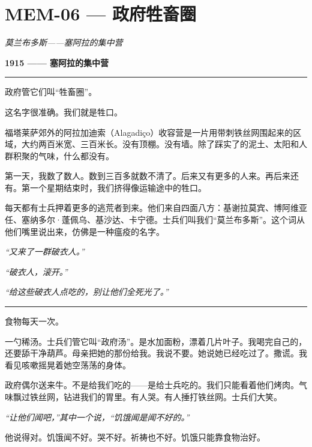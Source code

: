 \section*{\textbf{MEM-06} --- 政府牲畜圈}

\noindent \textit{莫兰布多斯——塞阿拉的集中营}

\noindent \textbf{1915 —— 塞阿拉的集中营}

\vspace{0.5em}\noindent\rule{\textwidth}{0.5pt}\vspace{0.5em}

\noindent 政府管它们叫“牲畜圈”。

\noindent 这名字很准确。我们就是牲口。

\noindent 福塔莱萨郊外的阿拉加迪索（Alagadiço）收容营是一片用带刺铁丝网围起来的区域，大约两百米宽、三百米长。没有顶棚。没有墙。除了踩实了的泥土、太阳和人群积聚的气味，什么都没有。

\noindent 第一天，我数了数人。数到三百多就数不清了。后来又有更多的人来。再后来还有。第一个星期结束时，我们挤得像运输途中的牲口。

\noindent 每天都有士兵押着更多的逃荒者到来。他们来自四面八方：基谢拉莫宾、博阿维亚任、塞纳多尔·蓬佩乌、基沙达、卡宁德。士兵们叫我们“莫兰布多斯”。这个词从他们嘴里说出来，仿佛是一种瘟疫的名字。

\noindent \textit{“又来了一群破衣人。”}

\noindent \textit{“破衣人，滚开。”}

\noindent \textit{“给这些破衣人点吃的，别让他们全死光了。”}

\vspace{0.5em}\noindent\rule{\textwidth}{0.5pt}\vspace{0.5em}

\noindent 食物每天一次。

\noindent 一勺稀汤。士兵们管它叫“政府汤”。是水加面粉，漂着几片叶子。我喝完自己的，还要舔干净葫芦。母亲把她的那份给我。我说不要。她说她已经吃过了。撒谎。我看见咳嗽摇晃着她空荡荡的身体。

\noindent 政府偶尔送来牛。不是给我们吃的——是给士兵吃的。我们只能看着他们烤肉。气味飘过铁丝网，钻进我们的胃里。有人哭。有人捶打铁丝网。士兵们大笑。

\noindent \textit{“让他们闻吧，”其中一个说，“饥饿闻是闻不好的。”}

\noindent 他说得对。饥饿闻不好。哭不好。祈祷也不好。饥饿只能靠食物治好。

